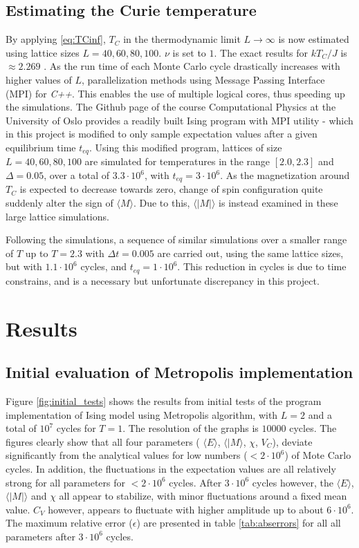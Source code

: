 \documentclass[%
oneside,                 %
final,                   %
10pt]{article}
\begin{document}
\subsection{Estimating the Curie temperature}
\label{SS.Est.Curie}
By applying \eqref{eq:TCinf}, $T_C$ in the thermodynamic limit $L \rightarrow \infty$ is now estimated using lattice sizes $L=40, 60, 80,100$. $\nu$ is set to $1$. The exact results for $kT_C/J$ is $\approx 2.269$ \cite{assignmentpaper}.  As the run time of each Monte Carlo cycle drastically increases with higher values of $L$, parallelization methods using Message Passing Interface (MPI) for \textit{C++}. This enables the use of multiple logical cores, thus speeding up the simulations.  The Github page of the course Computational Physics at the University of Oslo \cite{CPgithub} provides a readily built Ising program with MPI utility - which in this project is modified to only sample expectation values after a given equilibrium time $t_{eq}$. Using this modified program, lattices of size $L=40, 60, 80, 100$ are simulated for temperatures in the range $[2.0,2.3]$ and $\Delta=0.05$, over a total of $3.3 \cdot 10^6$, with $t_{eq}=3 \cdot 10^6$. As the magnetization around $T_C$ is expected to decrease towards zero, change of spin configuration quite suddenly alter the sign of $\langle M \rangle$. Due to this, $\langle |M| \rangle$ is instead examined in these large lattice simulations. \newline

Following the simulations, a sequence of similar simulations over a smaller range of $T$ up to $T=2.3$ with $\Delta t=0.005$ are carried out, using the same lattice sizes, but with $1.1 \cdot 10^6$ cycles, and $t_{eq}=1 \cdot 10^6$. This reduction in cycles is due to time constrains, and is a necessary but unfortunate discrepancy in this project. 


\section{Results}
\subsection{Initial evaluation of Metropolis implementation}
\label{SS:R.initialeval}
Figure \ref{fig:initial_tests} shows the results from initial tests of the program implementation of Ising model using Metropolis algorithm, with $L=2$ and a total of $10^7$ cycles for $T=1$. The resolution of the graphs is $10000$ cycles. The figures clearly show that all four parameters ( $\langle E \rangle$, $\langle | M \rangle$, $\chi$, $V_C$), deviate significantly from the analytical values for low numbers ($<2 \cdot 10^6 $) of Mote Carlo cycles. In addition, the fluctuations in the expectation values are all relatively strong for all parameters for $<2 \cdot 10^6 $ cycles. After $3 \cdot 10^6$ cycles however, the $\langle E\rangle$, $\langle |M| \rangle$ and $\chi$ all appear to stabilize, with minor fluctuations around a fixed mean value. $C_V$ however, appears to fluctuate with higher amplitude up to about $6 \cdot 10^6$. The maximum relative error ($\epsilon$) are presented in table  \ref{tab:abserrors} for all all parameters after $3 \cdot 10^6$ cycles.
\end{document}
